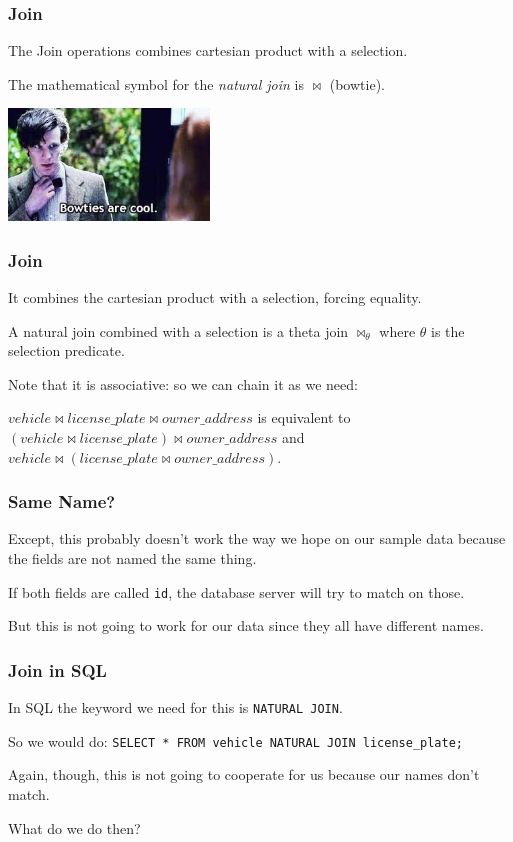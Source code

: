 \begin{frame}
\frametitle{Join}

The \alert{Join} operations combines cartesian product with a selection.

The mathematical symbol for the \textit{natural join} is $\Join$ (bowtie). 

\begin{center}
	\includegraphics[width=0.4\textwidth]{images/bowties.jpg}
\end{center}

\end{frame}




\begin{frame}
\frametitle{Join}

It combines the cartesian product with a selection, forcing equality. 

A natural join combined with a selection is a theta join $\Join_{\theta}$ where $\theta$ is the selection predicate.

 Note that it is associative: so we can chain it as we need: 
 
 $vehicle \Join license\_plate \Join owner\_address$ is equivalent to  $(vehicle \Join license\_plate) \Join owner\_address$  and $vehicle \Join (license\_plate \Join owner\_address)$.


\end{frame}



\begin{frame}
\frametitle{Same Name?}

Except, this probably doesn't work the way we hope on our sample data because the fields are not named the same thing. 

If both fields are called \texttt{id}, the database server will try to match on those. 

But this is not going to work for our data since they all have different names. 


\end{frame}



\begin{frame}
\frametitle{Join in SQL}

In SQL the keyword we need for this is \texttt{NATURAL JOIN}. 

So we would do: \texttt{SELECT * FROM vehicle NATURAL JOIN license\_plate;} 

Again, though, this is not going to cooperate for us because our names don't match.

What do we do then?

\end{frame}



